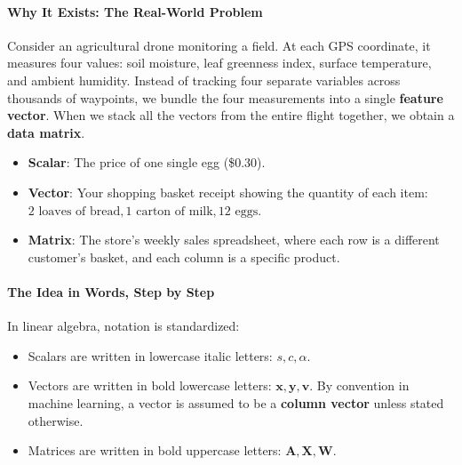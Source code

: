 \paragraph{Why It Exists: The Real-World Problem}
Consider an agricultural drone monitoring a field. At each GPS coordinate, it measures four values: soil moisture, leaf greenness index, surface temperature, and ambient humidity. Instead of tracking four separate variables across thousands of waypoints, we bundle the four measurements into a single \textbf{feature vector}. When we stack all the vectors from the entire flight together, we obtain a \textbf{data matrix}.

\begin{analogy}
\begin{itemize}
    \item \textbf{Scalar}: The price of one single egg (\$0.30).
    \item \textbf{Vector}: Your shopping basket receipt showing the quantity of each item: $2\text{ loaves of bread}, 1\text{ carton of milk}, 12\text{ eggs}$.
    \item \textbf{Matrix}: The store's weekly sales spreadsheet, where each row is a different customer's basket, and each column is a specific product.
\end{itemize}
\end{analogy}

\paragraph{The Idea in Words, Step by Step}
In linear algebra, notation is standardized:
\begin{itemize}
    \item Scalars are written in lowercase italic letters: $s, c, \alpha$.
    \item Vectors are written in bold lowercase letters: $\mathbf{x}, \mathbf{y}, \mathbf{v}$. By convention in machine learning, a vector is assumed to be a \textbf{column vector} unless stated otherwise.
    \item Matrices are written in bold uppercase letters: $\mathbf{A}, \mathbf{X}, \mathbf{W}$.
\end{itemize}

